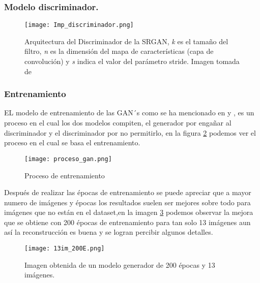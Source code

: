\subsubsection{Modelo discriminador.}

\begin{figure}[H]
  \begin{center}
    \texttt{[image: Imp\_discriminador.png]}
    \caption{Arquitectura del Discriminador de la SRGAN, \emph{k} es el tamaño
    del filtro, \emph{n} es la dimensión del mapa de características (capa de convolución) y \emph{s}
    indica el valor del parámetro stride. Imagen tomada de \cite{SRGAN}}
    \label{Alexis5}
  \end{center}
\end{figure}

\subsubsection{Entrenamiento}

EL modelo de entrenamiento de las GAN´s como se ha mencionado en \cite{GANs} y \cite{SRGAN}, es un proceso en el cual
los dos modelos compiten, el generador por engañar al discriminador y el discriminador por no permitirlo, en la figura \ref{Alexis6}
podemos ver el proceso en el cual se basa el entrenamiento.

\begin{figure}[H]
    \begin{center}
      \texttt{[image: proceso\_gan.png]}
      \caption{Proceso de entrenamiento}
      \label{Alexis6}
    \end{center}
\end{figure}


Después de realizar las épocas de entrenamiento se puede apreciar que a mayor numero de imágenes y 
épocas los resultados suelen ser mejores sobre todo para imágenes que no están en el dataset,en la imagen
\ref{Alexis7} podemos observar la mejora que se obtiene con 200 épocas de entrenamiento para tan solo 13 imágenes 
aun así la reconstrucción es buena y se logran percibir algunos detalles.

\begin{figure}[H]
  \begin{center}
    \texttt{[image: 13im\_200E.png]}
    \caption{Imagen obtenida de un modelo generador de 200 épocas y 13 imágenes.}
    \label{Alexis7}
  \end{center}
\end{figure}

